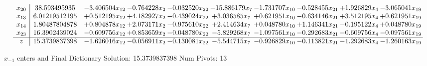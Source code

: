 \documentclass[10pt]{article}
\begin{document}
\[\begin{array}{c| c c@{\hskip 2pt} c@{\hskip 2pt} c@{\hskip 2pt} c@{\hskip 2pt} c@{\hskip 2pt} c@{\hskip 2pt} c@{\hskip 2pt} c@{\hskip 2pt} }
 x_{20}   &  38.593495935 & -3.406504 x_{12} & -0.764228 x_{2} & -0.032520 x_{22} & -15.886179 x_{7} & -1.731707 x_{10} & -0.528455 x_{21} & + 1.926829 x_{4} & -3.065041 x_{19}\\
 x_{13}   &  6.01219512195 & + 0.512195 x_{12} & + 4.182927 x_{2} & -0.439024 x_{22} & + 3.036585 x_{7} & + 0.621951 x_{10} & -0.634146 x_{21} & + 3.512195 x_{4} & + 0.621951 x_{19}\\
 x_{14}   &  1.80487804878 & + 0.804878 x_{12} & + 2.073171 x_{2} & -0.975610 x_{22} & + 2.414634 x_{7} & + 0.048780 x_{10} & + 1.146341 x_{21} & -0.195122 x_{4} & + 0.048780 x_{19}\\
 x_{23}   &  16.3902439024 & -0.609756 x_{12} & + 0.853659 x_{2} & -0.048780 x_{22} & -5.829268 x_{7} & -1.097561 x_{10} & -0.292683 x_{21} & -0.609756 x_{4} & -0.097561 x_{19}\\
\hline
z    &  15.3739837398 & -1.626016 x_{12} & -0.056911 x_{2} & -0.130081 x_{22} & -5.544715 x_{7} & -0.926829 x_{10} & -0.113821 x_{21} & -1.292683 x_{4} & -1.260163 x_{19}\\
\end{array}\]


 $ x_{-1} $ enters and Final Dictionary
Solution:  15.3739837398
Num Pivots:  13
\end{document}
